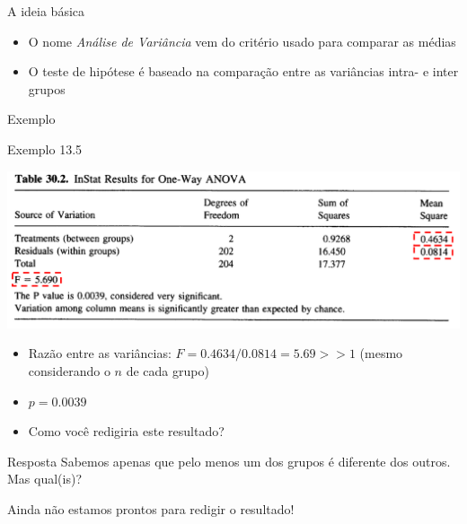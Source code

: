 \documentclass{beamer}
\begin{document}
\begin{frame}{A ideia básica}
  \begin{itemize}
  \item O nome {\em Análise de Variância} vem do critério usado para comparar as médias
  \item O teste de hipótese é baseado na comparação entre as variâncias intra- e inter grupos
  \end{itemize}
\end{frame}

\begin{frame}{Exemplo}
  \begin{exampleblock}{Exemplo 13.5}
    \begin{center}
      \includegraphics[width=.6\textwidth]{Topicos_adv/exemplo13_5-3}
    \end{center}
  \begin{itemize}
  \item Razão entre as variâncias: $F = 0.4634/0.0814 = 5.69 >> 1$ {\tiny (mesmo considerando o $n$ de cada grupo)}
  \item $p=0.0039$
  \item Como você redigiria este resultado?
  \end{itemize}
  \end{exampleblock}
\end{frame}

\begin{frame}{}
  \begin{block}{Resposta}
    Sabemos apenas que pelo menos um dos grupos é diferente dos outros.
    Mas qual(is)?

    \bigskip
    Ainda não estamos prontos para redigir o resultado!
  \end{block}
\end{frame}

\end{document}
